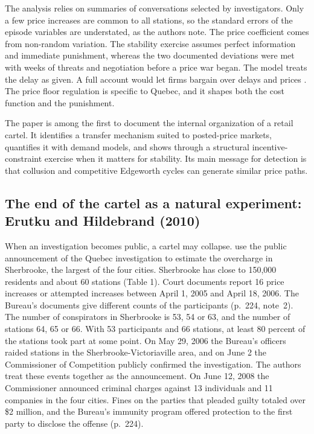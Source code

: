 The analysis relies on summaries of conversations selected by investigators. Only a few price increases are common to all
stations, so the standard errors of the episode variables are understated, as the authors note. The price coefficient comes from
non-random variation. The stability exercise assumes perfect information and immediate punishment, whereas the two documented
deviations were met with weeks of threats and negotiation before a price war began. The model treats the delay as given. A full
account would let firms bargain over delays and prices \citep{Harrington1991}. The price floor regulation is specific to Quebec, and it
shapes both the cost function and the punishment.

The paper is among the first to document the internal organization of a retail cartel. It identifies a transfer mechanism suited to
posted-price markets, quantifies it with demand models, and shows through a structural incentive-constraint exercise when it matters
for stability. Its main message for detection is that collusion and competitive Edgeworth cycles can generate similar price paths.

\subsection{The end of the cartel as a natural experiment: Erutku and Hildebrand (2010)}\label{sec:13-erutku}

When an investigation becomes public, a cartel may collapse. \citet{ErutkuHildebrand2010} use the public announcement of the Quebec
investigation to estimate the overcharge in Sherbrooke, the largest of the four cities. Sherbrooke has close to 150,000 residents and
about 60 stations (Table 1). Court documents report 16 price increases or attempted increases between April 1, 2005 and April 18, 2006.
The Bureau's documents give different counts of the participants (p.~224, note~2). The number of conspirators in Sherbrooke is 53, 54
or 63, and the number of stations 64, 65 or 66. With 53 participants and 66 stations, at least 80 percent of the stations took part at
some point. On May 29, 2006 the Bureau's officers raided stations in the Sherbrooke-Victoriaville area, and on June 2 the Commissioner
of Competition publicly confirmed the investigation. The authors treat these events together as the announcement. On June 12, 2008
the Commissioner announced criminal charges against 13 individuals and 11 companies in the four cities. Fines on the parties that
pleaded guilty totaled over \$2 million, and the Bureau's immunity program offered protection to the first party to disclose the
offense (p.~224).


